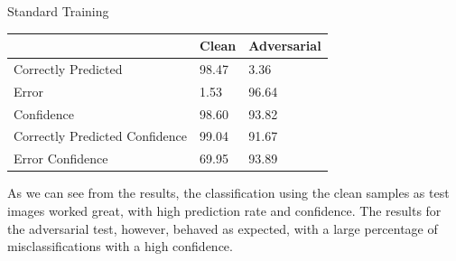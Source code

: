 \begin{tframe}{Standard Training}

\begin{table}[h]
\centering
\begin{tabular}{@{}lll@{}}
\toprule
                               & Clean & Adversarial \\ \midrule
Correctly Predicted            & 98.47 & 3.36        \\
Error                          & 1.53  & 96.64       \\
Confidence                     & 98.60 & 93.82       \\
Correctly Predicted Confidence & 99.04 & 91.67       \\
Error Confidence               & 69.95 & 93.89       \\ \bottomrule
\end{tabular}
\end{table}

As we can see from the results, the classification using the clean samples as test images worked great, with high prediction rate and confidence. The results for the adversarial test, however, behaved as expected, with a large percentage of misclassifications with a high confidence.

\end{tframe}